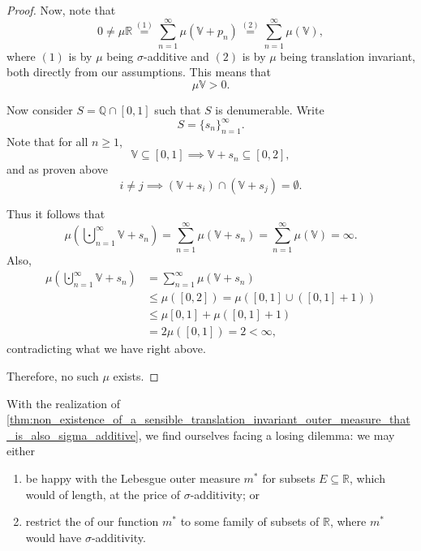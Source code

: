 \documentclass[notoc,notitlepage]{tufte-book}
\begin{document}
\begin{proof}
  Now, note that
  \begin{equation*}
    0 \neq \mu \mathbb{R} \overset{(1)}{=} \sum_{n=1}^{\infty} \mu(\mathbb{V} +
    p_n) \overset{(2)}{=} \sum_{n=1}^{\infty} \mu(\mathbb{V}),
  \end{equation*}
  where $(1)$ is by $\mu$ being $\sigma$-additive and $(2)$ is by $\mu$ being
  translation invariant, both directly from our assumptions. This means that
  \begin{equation*}
    \mu \mathbb{V} > 0.
  \end{equation*}

  \noindent
   Now consider $S = \mathbb{Q} \cap [0, 1]$ such that $S$ is
  denumerable. Write
  \begin{equation*}
    S = \{ s_n \}_{n=1}^{\infty}.
  \end{equation*}
  Note that for all $n \geq 1$,
  \begin{equation*}
    \mathbb{V} \subseteq [0, 1] \implies \mathbb{V} + s_n \subseteq [0, 2],
  \end{equation*}
  and as proven above
  \begin{equation*}
    i \neq j \implies (\mathbb{V} + s_i) \cap (\mathbb{V} + s_j) = \emptyset.
  \end{equation*}

  Thus it follows that
  \begin{equation*}
    \mu \left( \bigcupdot_{n=1}^{\infty} \mathbb{V} + s_n \right)
    = \sum_{n=1}^{\infty} \mu (\mathbb{V} + s_n) 
    = \sum_{n=1}^{\infty} \mu(\mathbb{V})
    = \infty.
  \end{equation*}
  Also,
  \begin{align*}
    \mu \left( \bigcupdot_{n=1}^{\infty} \mathbb{V} + s_n \right)
    &= \sum_{n=1}^{\infty} \mu (\mathbb{V} + s_n) \\
    &\leq \mu([0, 2]) = \mu([0, 1] \cup ([0, 1] + 1)) \\
    &\leq \mu[0, 1] + \mu([0, 1] + 1) \\
    &= 2 \mu([0, 1]) = 2 < \infty,
  \end{align*}
  contradicting what we have right above.

  Therefore, no such $\mu$ exists.
\end{proof}

With the realization of
\cref{thm:non_existence_of_a_sensible_translation_invariant_outer_measure_that_is_also_sigma_additive},
we find ourselves facing a losing dilemma: we may either
\begin{enumerate}
  \item be happy with the Lebesgue outer measure $m^*$ for 
    subsets $E \subseteq \mathbb{R}$, which would  of length, at the price of $\sigma$-additivity; or
  \item restrict the  of our function $m^*$ to some family of
    subsets of $\mathbb{R}$, where $m^*$ would have $\sigma$-additivity.
\end{enumerate}
\end{document}
